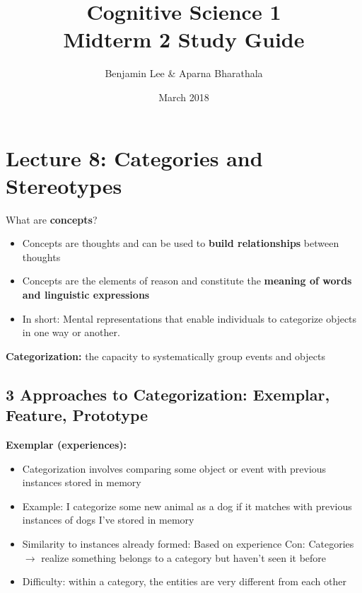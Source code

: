 \documentclass{article}
\title{Cognitive Science 1 \\ Midterm 2 Study Guide}
\author{Benjamin Lee \& Aparna Bharathala}
\date{March 2018}
\begin{document}
\maketitle



\section{Lecture 8: Categories and Stereotypes}
What are \textbf{concepts}? 
\begin{itemize}
    \item Concepts are thoughts and can be used to \textbf{build relationships} between thoughts
    \item Concepts are the elements of reason and constitute the \textbf{meaning of words and linguistic expressions}
    \item In short: Mental representations that enable individuals to categorize objects in one way or another.
\end{itemize}
\textbf{Categorization:} the capacity to systematically group events and objects \\

\subsection{3 Approaches to Categorization: Exemplar, Feature, Prototype}

\noindent \textbf{Exemplar (experiences):}
\begin{itemize}
    \item Categorization involves comparing some object or event with previous instances stored in memory 
    \item Example: I categorize some new animal as a dog if it matches with previous instances of dogs I've stored in memory
    \item Similarity to instances already formed: 
        \subitem Based on experience
        \subitem Con: Categories $\rightarrow$ realize something belongs to a category but haven't seen it before
    \item Difficulty: within a category, the entities are very different from each other
\end{itemize}
\end{document}
